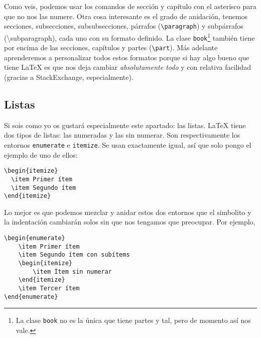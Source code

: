 Como veis, podemos usar los comandos de sección y capítulo con el
asterisco para que no nos las numere. Otra cosa interesante es el grado
de anidación, tenemos secciones, subsecciones, subsubsecciones, párrafos
(\lstinline!\paragraph!) y subpárrafos (\textbackslash{}subparagraph),
cada uno con su formato definido. La clase \lstinline!book!\footnote{La
  clase \lstinline!book! no es la única que tiene partes y tal, pero de
  momento así nos vale.} también tiene por encima de las secciones,
capítulos y partes (\lstinline!\part!). Más adelante aprenderemos a
personalizar todos estos formatos porque si hay algo bueno que tiene
LaTeX es que nos deja cambiar \emph{absolutamente todo} y con relativa
facilidad (gracias a StackExchange, especialmente).

\subsection{Listas}\label{listas}

Si sois como yo os gustará especialmente este apartado: las listas.
LaTeX tiene dos tipos de listas: las numeradas y las sin numerar. Son
respectivamente los entornos \lstinline!enumerate! e
\lstinline!itemize!. Se usan exactamente igual, así que solo pongo el
ejemplo de uno de ellos:

\begin{lstlisting}[language={[latex]tex}]
\begin{itemize}
  \item Primer ítem
  \item Segundo ítem
\end{itemize}
\end{lstlisting}

Lo mejor es que podemos mezclar y anidar estos dos entornos que el
simbolito y la indentación cambiarán solos sin que nos tengamos que
preocupar. Por ejemplo,

\begin{lstlisting}[language={[latex]tex}]
\begin{enumerate}
    \item Primer ítem
    \item Segundo ítem con subítems
    \begin{itemize}
        \item Ítem sin numerar
    \end{itemize}
    \item Tercer ítem
\end{enumerate}
\end{lstlisting}

